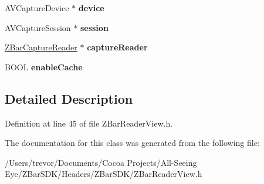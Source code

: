 \begin{DoxyCompactItemize}
\item 
\hypertarget{interface_z_bar_reader_view_a20ed04fac77bdb9f1cfb168cbf6fd506}{
AVCaptureDevice $\ast$ {\bfseries device}}
\label{interface_z_bar_reader_view_a20ed04fac77bdb9f1cfb168cbf6fd506}

\item 
\hypertarget{interface_z_bar_reader_view_a2007bf57af7c22bb74a269b749690e09}{
AVCaptureSession $\ast$ {\bfseries session}}
\label{interface_z_bar_reader_view_a2007bf57af7c22bb74a269b749690e09}

\item 
\hypertarget{interface_z_bar_reader_view_a2b1d68fbb95d2b8f2e5f2ee92e6f3f14}{
\hyperlink{interface_z_bar_capture_reader}{ZBarCaptureReader} $\ast$ {\bfseries captureReader}}
\label{interface_z_bar_reader_view_a2b1d68fbb95d2b8f2e5f2ee92e6f3f14}

\item 
\hypertarget{interface_z_bar_reader_view_a6165c196400b7f94e3423e2a5f5f71d1}{
BOOL {\bfseries enableCache}}
\label{interface_z_bar_reader_view_a6165c196400b7f94e3423e2a5f5f71d1}

\end{DoxyCompactItemize}


\subsection{Detailed Description}


Definition at line 45 of file ZBarReaderView.h.



The documentation for this class was generated from the following file:\begin{DoxyCompactItemize}
\item 
/Users/trevor/Documents/Cocoa Projects/All-\/Seeing Eye/ZBarSDK/Headers/ZBarSDK/ZBarReaderView.h\end{DoxyCompactItemize}
